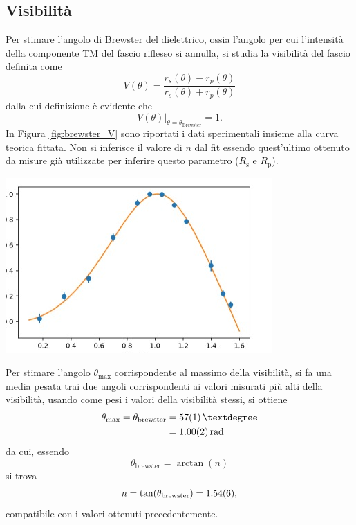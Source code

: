 \documentclass[10pt,oneside,a4paper]{article}
\newenvironment{Figure}
  {\par\medskip\noindent\minipage{\linewidth}}
  {\endminipage\par\medskip}
\begin{document}
\begin{multicols}{2}
\subsection{Visibilità}
Per stimare l'angolo di Brewster del dielettrico, ossia l'angolo per cui l'intensità della componente TM del fascio riflesso si annulla, si studia la visibilità del fascio definita come
\begin{equation}\label{eq:visibilità}
	V(\theta) = \frac{r_s(\theta) - r_p(\theta)}{r_s(\theta) + r_p(\theta)}
\end{equation}
dalla cui definizione è evidente che
\begin{equation}
	\left. V(\theta) \right\vert_{\theta = \theta_\mathrm{Brewster}} = 1.
\end{equation}
In Figura \ref{fig:brewster_V} sono riportati i dati sperimentali insieme alla curva teorica fittata. Non si inferisce il valore di $n$ dal fit essendo quest'ultimo ottenuto da misure già utilizzate per inferire questo parametro ($R_\mathrm{s}$ e $R_\mathrm{p}$).
\begin{Figure}
	\begin{center}
	\includegraphics[width=\linewidth]{visibilita.jpg}
	\label{fig:brewster_V}
	\end{center}
\end{Figure}
Per stimare l'angolo $\theta_\mathrm{max}$ corrispondente al massimo della visibilità, si fa una media pesata trai due angoli corrispondenti ai valori misurati più alti della visibilità, usando come pesi i valori della visibilità stessi, si ottiene
\begin{align}
	\theta_\mathrm{max} = \theta_\mathrm{brewster} &= \SI{57 \pm 1}{°} \\ &= \SI{1.00 \pm 0.02}{\mathrm{rad}}
\end{align}
da cui, essendo 
\begin{equation}
	\theta_\mathrm{brewster} = \arctan (n)
\end{equation}
si trova 
\begin{equation}
	n = \tan (\theta_\mathrm{brewster} )= \SI{1.54 \pm 0.06}{},
\end{equation}
compatibile con i valori ottenuti precedentemente.

\end{multicols}
\end{document}
